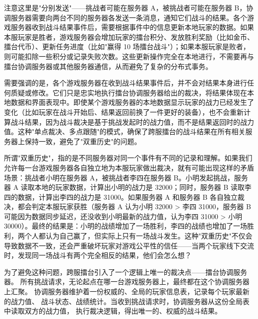 注意这里是"分别发送"——挑战者可能在服务器 A，被挑战者可能在服务器 B，协调服务器需要向两台不同的服务器各发送一条消息，通知它们战斗的结果。各个游戏服务器收到战斗结果事件后，需要根据事件中的信息更新本地玩家的数据。如果本服玩家是胜者，游戏服务器会增加玩家的擂台积分、发放胜利奖励（比如金币、擂台代币）、更新任务进度（比如"赢得 10 场擂台战斗"）；如果本服玩家是败者，则可能扣除一些积分或记录失败次数。这些更新操作完全在本地进行，不需要再与擂台协调服务器或其他服务器通信，从而避免了复杂的分布式事务。

需要强调的是，各个游戏服务器在收到战斗结果事件后，并不会对结果本身进行任何质疑或修改。它们只是忠实地执行擂台协调服务器给出的裁决，将结果体现在本地数据和界面表现中。即使某个游戏服务器的本地数据显示玩家的战力已经发生了变化（比如玩家在战斗开始后、结果返回前换了一件更好的装备），也不会重新计算战斗结果，因为战斗裁决是基于挑战发起时的战力值，而不是结果返回时的战力值。这种"单点裁决、多点跟随"的模式，确保了跨服擂台的战斗结果在所有相关服务器上保持一致，避免了"双重历史"的问题。

所谓"双重历史"，指的是不同服务器对同一个事件有不同的记录和理解。如果我们允许每一台游戏服务器各自独立地为本服玩家做出裁决，就有可能出现这样的矛盾场景：挑战者小明在服务器 A，被挑战者李四在服务器 B。小明发起挑战，服务器 A 读取本地的玩家数据，计算出小明的战力是 32000；同时，服务器 B 读取李四的数据，计算出李四的战力是 31000。如果服务器 A 和服务器 B 各自独立裁决，都会判定本服玩家获胜（服务器 A 认为小明 32000 > 李四 31000，服务器 B 可能因为数据同步延迟，还没收到小明最新的战力值，认为李四 31000 > 小明 30000）。最终的结果是：小明的战绩增加了一场胜利，李四的战绩也增加了一场胜利，两个人都认为自己赢了，但实际上只有一场战斗发生。这种"双重历史"不仅会导致数据不一致，还会严重破坏玩家对游戏公平性的信任——当两个玩家线下交流时，发现同一场战斗有两个完全相反的结果，他们会怎么想？


为了避免这种问题，跨服擂台引入了一个逻辑上唯一的裁决点——擂台协调服务器。
所有挑战请求，无论起点在哪一台游戏服务器上，最终都在这个协调服务器上汇聚。
协调服务器维护着一份权威的、全局的玩家信息表，记录每个玩家最新的战力值、
战斗状态、战绩统计。当收到挑战请求时，协调服务器从这份全局表中读取双方的战力值，
执行裁决逻辑，得出唯一的、权威的战斗结果。

